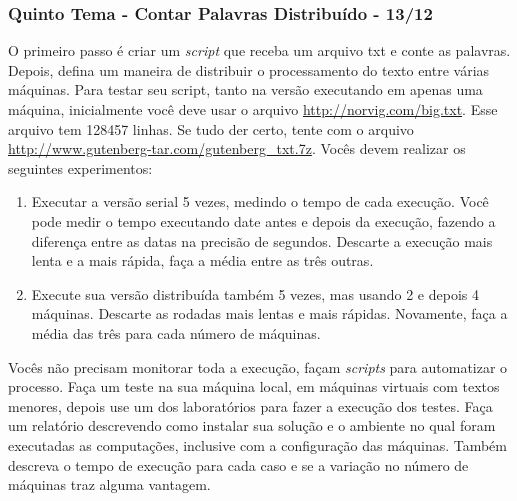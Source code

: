 \documentclass{beamer}
\begin{document}
   \begin{frame}
      \frametitle{Quinto Tema - Contar Palavras Distribuído - 13/12}
       \footnotesize
       O primeiro passo é criar um \textit{script} que receba um arquivo txt e conte as palavras. Depois, defina um maneira de distribuir o processamento do texto entre várias máquinas. Para testar seu script, tanto na versão executando em apenas uma máquina, inicialmente você deve usar o arquivo \url{http://norvig.com/big.txt}. Esse arquivo tem 128457 linhas. Se tudo der certo, tente com o arquivo \url{http://www.gutenberg-tar.com/gutenberg_txt.7z}. Vocês devem realizar os seguintes experimentos:
       \begin{enumerate}
          \item Executar a versão serial 5 vezes, medindo o tempo de cada execução. Você pode medir o tempo executando date antes e depois da execução, fazendo a diferença entre as datas na precisão de segundos. Descarte a execução mais lenta e a mais rápida, faça a média entre as três outras.
          \item Execute sua versão distribuída também 5 vezes, mas usando 2 e depois 4 máquinas. Descarte as rodadas mais lentas e mais rápidas. Novamente, faça a média das três para cada número de máquinas. 
       \end{enumerate}
       Vocês não precisam monitorar toda a execução, façam \textit{scripts} para automatizar o processo. Faça um teste na sua máquina local, em máquinas virtuais com textos menores, depois use um dos laboratórios para fazer a execução dos testes. Faça um relatório descrevendo como instalar sua solução e o ambiente no qual foram executadas as computações, inclusive com a configuração das máquinas. Também descreva o tempo de execução para cada caso e se a variação no número de máquinas traz alguma vantagem. 
   \end{frame}
\end{document}
